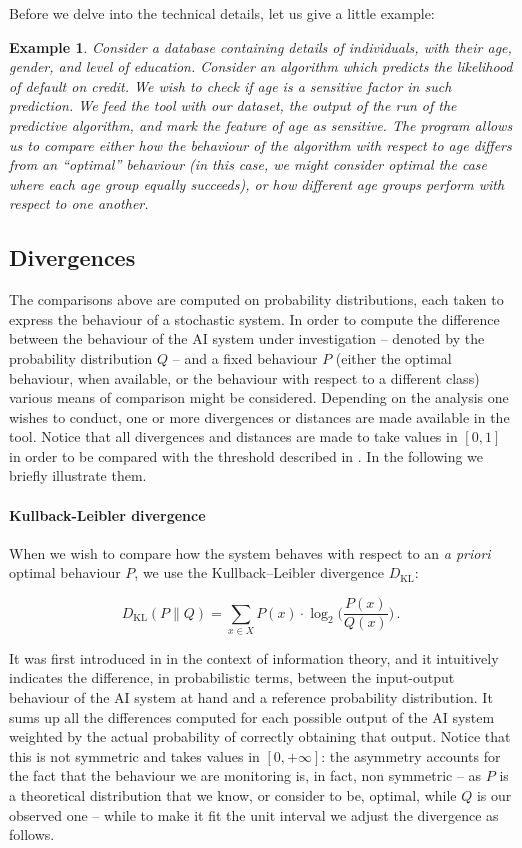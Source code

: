 \documentclass[
]{ceurart}
\newtheorem{example}{Example}
\begin{document}
Before we delve into the technical details, let us give a little example: 

\begin{example}
Consider a database containing details of individuals, with their age, gender, and level of education. Consider an algorithm which predicts the likelihood of default on credit. We wish to check if age is a sensitive factor in such prediction. We feed the tool with our dataset, the output of the run of the predictive algorithm, and mark the feature of age as sensitive. The program allows us to compare either how the behaviour of the algorithm with respect to age differs from an ``optimal'' behaviour (in this case, we might consider optimal the case where each age group equally succeeds), or how different age groups perform with respect to one another.
\end{example}
 
\subsection{Divergences}
The comparisons above are computed on probability distributions, each taken to express the behaviour of a stochastic system. In order to compute the difference between the behaviour of the AI system under investigation -- denoted by the probability distribution $Q$ -- and a fixed behaviour $P$ (either the optimal behaviour, when available, or the behaviour with respect to a different class) various means of comparison might be considered. Depending on the analysis one wishes to conduct, one or more divergences or distances are made available in the tool. Notice that all divergences and distances are made to take values in $[0,1]$ in order to be compared with the threshold described in . In the following we briefly illustrate them.


\paragraph{Kullback-Leibler divergence}
When we wish to compare how the system behaves with respect to an \textit{a priori} optimal behaviour $P$, we use the Kullback–Leibler divergence $D_{\mathrm{KL}}$:

\[D_{\mathrm{KL}}(P\parallel Q)= \sum _{x\in X} P(x)\cdot \log_2 \Big( \frac{P(x)}{Q(x)}\Big)\,.\]

It was first introduced in \cite{dkl} in the context of information theory, and it intuitively indicates the difference, in probabilistic terms, between the input-output behaviour of the AI system at hand and a reference probability distribution. It sums up all the differences computed for each possible output of the AI system weighted by the actual probability of correctly obtaining that output. Notice that this is not symmetric and takes values in $[0,+\infty]$: the asymmetry accounts for the fact that the behaviour we are monitoring is, in fact, non symmetric -- as $P$ is a theoretical distribution that we know, or consider to be, optimal, while $Q$ is our observed one -- while to make it fit the unit interval we adjust the divergence as follows.
\end{document}

